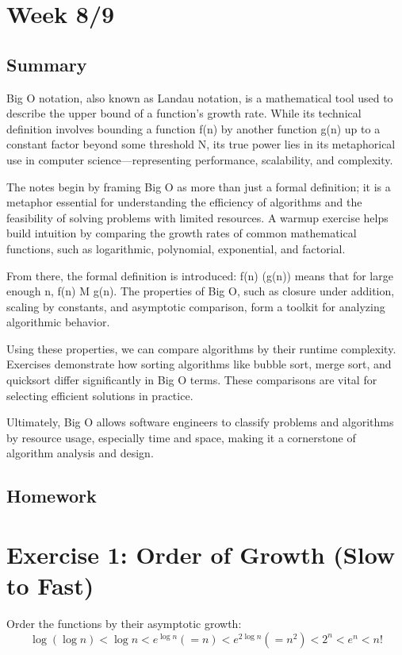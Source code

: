 \documentclass{article}
\begin{document}
\section{Week 8/9}
\subsection{Summary}


Big O notation, also known as Landau notation, is a mathematical tool used to describe the upper bound of a function’s growth rate. While its technical definition involves bounding a function f(n) by another function g(n) up to a constant factor beyond some threshold N, its true power lies in its metaphorical use in computer science—representing performance, scalability, and complexity.

The notes begin by framing Big O as more than just a formal definition; it is a metaphor essential for understanding the efficiency of algorithms and the feasibility of solving problems with limited resources. A warmup exercise helps build intuition by comparing the growth rates of common mathematical functions, such as logarithmic, polynomial, exponential, and factorial.

From there, the formal definition is introduced: f(n) \in {}(g(n)) means that for large enough n, f(n) \leq M \cdot g(n). The properties of Big O, such as closure under addition, scaling by constants, and asymptotic comparison, form a toolkit for analyzing algorithmic behavior.

Using these properties, we can compare algorithms by their runtime complexity. Exercises demonstrate how sorting algorithms like bubble sort, merge sort, and quicksort differ significantly in Big O terms. These comparisons are vital for selecting efficient solutions in practice.

Ultimately, Big O allows software engineers to classify problems and algorithms by resource usage, especially time and space, making it a cornerstone of algorithm analysis and design.
\subsection{Homework}
\section*{Exercise 1: Order of Growth (Slow to Fast)}
Order the functions by their asymptotic growth:
\[
\log(\log n) < \log n < e^{\log n} (= n) < e^{2\log n} (= n^2) < 2^n < e^n < n!
\]
\end{document}
